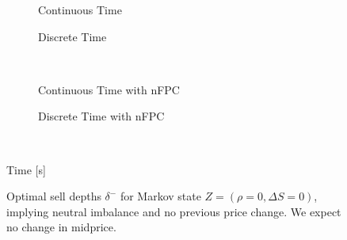 \begin{figure}%
\centering%
\begin{subfigure}[b]{.4\linewidth}%
  \setlength\figureheight{\linewidth}%
  \setlength\figurewidth{\linewidth}%
  \caption{Continuous Time}%
\end{subfigure}%
\hspace{1.5cm}%
\begin{subfigure}[b]{.4\linewidth}%
  \setlength\figureheight{\linewidth}%
  \setlength\figurewidth{\linewidth}%
  \caption{Discrete Time}%
\end{subfigure}\\%
\vspace{1cm}%
\begin{subfigure}[b]{.4\linewidth}%
  \setlength\figureheight{\linewidth}%
  \setlength\figurewidth{\linewidth}%
  \caption{Continuous Time with nFPC}%
\end{subfigure}%
\hspace{1.5cm}%
\begin{subfigure}[b]{.4\linewidth}%
  \setlength\figureheight{\linewidth}%
  \setlength\figurewidth{\linewidth}%
  \caption{Discrete Time with nFPC}%
\end{subfigure}\\%
%
\leavevmode{}\hspace{0pt plus 1filll}\null%

Time [s]

\vspace{1cm}%
\begin{subfigure}{\linewidth}%
  \centering%
\end{subfigure}%
  \caption[Optimal sell LO depths for neutral imbalance]{Optimal sell depths $\delta^-$ for Markov state $Z=(\rho = 0, \Delta S = 0)$, implying neutral imbalance and no previous price change. We expect no change in midprice.}\label{fig:comp_dm_z8}%
\end{figure}
